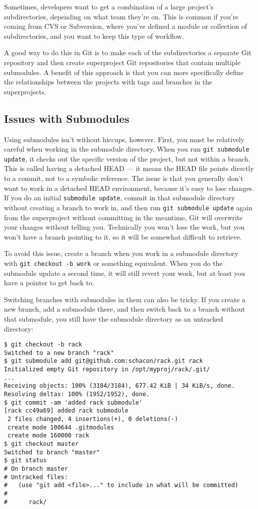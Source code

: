 \documentclass[a4paper]{book}
\begin{document}
Sometimes, developers want to get a combination of a large project's subdirectories, depending on what team they're on. This is common if you're coming from CVS or Subversion, where you've defined a module or collection of subdirectories, and you want to keep this type of workflow.

A good way to do this in Git is to make each of the subdirectories a separate Git repository and then create superproject Git repositories that contain multiple submodules. A benefit of this approach is that you can more specifically define the relationships between the projects with tags and branches in the superprojects.

\subsection{Issues with Submodules}\label{issues-with-submodules}

Using submodules isn't without hiccups, however. First, you must be relatively careful when working in the submodule directory. When you run \texttt{git submodule update}, it checks out the specific version of the project, but not within a branch. This is called having a detached HEAD --- it means the HEAD file points directly to a commit, not to a symbolic reference. The issue is that you generally don't want to work in a detached HEAD environment, because it's easy to lose changes. If you do an initial \texttt{submodule update}, commit in that submodule directory without creating a branch to work in, and then run \texttt{git submodule update} again from the superproject without committing in the meantime, Git will overwrite your changes without telling you. Technically you won't lose the work, but you won't have a branch pointing to it, so it will be somewhat difficult to retrieve.

To avoid this issue, create a branch when you work in a submodule directory with \texttt{git checkout -b work} or something equivalent. When you do the submodule update a second time, it will still revert your work, but at least you have a pointer to get back to.

Switching branches with submodules in them can also be tricky. If you create a new branch, add a submodule there, and then switch back to a branch without that submodule, you still have the submodule directory as an untracked directory:

\begin{shaded}\begin{verbatim}
$ git checkout -b rack
Switched to a new branch "rack"
$ git submodule add git@github.com:schacon/rack.git rack
Initialized empty Git repository in /opt/myproj/rack/.git/
...
Receiving objects: 100% (3184/3184), 677.42 KiB | 34 KiB/s, done.
Resolving deltas: 100% (1952/1952), done.
$ git commit -am 'added rack submodule'
[rack cc49a69] added rack submodule
 2 files changed, 4 insertions(+), 0 deletions(-)
 create mode 100644 .gitmodules
 create mode 160000 rack
$ git checkout master
Switched to branch "master"
$ git status
# On branch master
# Untracked files:
#   (use "git add <file>..." to include in what will be committed)
#
#      rack/
\end{verbatim}\end{shaded}
\end{document}
